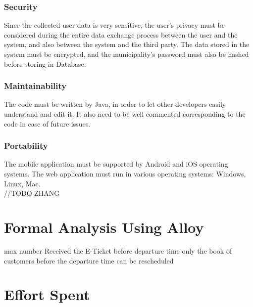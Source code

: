 \documentclass[a4paper,12pt]{report}
\begin{document}
\subsection{Security} 
Since the collected user data is very sensitive, the user’s privacy must be considered during the entire data exchange process between the user and the system, and also between the system and the third party. The data stored in the system must be encrypted, and the municipality’s password must also be hashed before storing in Database.\\

\subsection{Maintainability} The code must be written by Java, in order to let other developers easily understand and edit it. It also need to be well commented corresponding to the code in case of future issues.\\

\subsection{Portability} The mobile application must be supported by Android and iOS operating systems. The web application must run in various operating systems: Windows, Linux, Mac.\\




//TODO ZHANG
\chapter{Formal Analysis Using Alloy}

max number
Received the E-Ticket before departure time
only the book of customers before the departure time can be rescheduled



\chapter{Effort Spent}
\end{document}
